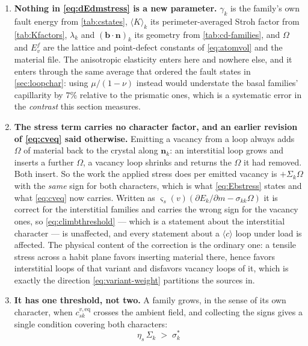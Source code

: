 \documentclass{article}
\newcommand{\cloop}{\ensuremath{\langle c\rangle}}
\newcommand{\bvec}{\bm b}
\newcommand{\nvec}{\bm n}
\begin{document}
\begin{enumerate}
\item \textbf{Nothing in \cref{eq:dEdmstress} is a new parameter.} $\gamma_k$ is
      the family's own fault energy from \cref{tab:cstates}, $\langle K\rangle_k$
      its perimeter-averaged Stroh factor from \cref{tab:Kfactors}, $\lambda_k$
      and $(\bvec\!\cdot\!\nvec)_k$ its geometry from \cref{tab:cd-families}, and
      $\Omega$ and $E^f_v$ are the lattice and point-defect constants of
      \cref{eq:atomvol} and the material file. The anisotropic elasticity enters
      here and nowhere else, and it enters through the same average that ordered
      the fault states in \cref{sec:loopchar}: using $\mu/(1-\nu)$ instead would
      understate the basal families' capillarity by $7\%$ relative to the
      prismatic ones, which is a systematic error in the \emph{contrast} this
      section measures.
\item \textbf{The stress term carries no character factor, and an earlier
      revision of \cref{eq:cveq} said otherwise.} Emitting a vacancy from a loop
      always adds $\Omega$ of material back to the crystal along $\nvec_k$: an
      interstitial loop grows and inserts a further $\Omega$, a vacancy loop
      shrinks and returns the $\Omega$ it had removed. Both insert. So the work
      the applied stress does per emitted vacancy is $+\Sigma_k\Omega$ with the
      \emph{same} sign for both characters, which is what \cref{eq:Ebstress}
      states and what \cref{eq:cveq} now carries. Written as
      $\varsigma_s(v)\left(\partial E_k/\partial m-\sigma_{kk}\Omega\right)$ it
      is correct for the interstitial families and carries the wrong sign for the
      vacancy ones, so \cref{eq:climbthreshold} --- which is a statement about the
      interstitial character --- is unaffected, and every statement about a
      \cloop{} loop under load is affected. The physical content of the
      correction is the ordinary one: a tensile stress across a habit plane
      favors inserting material there, hence favors interstitial loops of that
      variant and disfavors vacancy loops of it, which is exactly the direction
      \cref{eq:variant-weight} partitions the sources in.
\item \textbf{It has one threshold, not two.} A family grows, in the sense of its
      own character, when $c^{v,\mathrm{eq}}_{sk}$ crosses the ambient field, and
      collecting the signs gives a single condition covering both characters:
      \begin{equation}
        \eta_s\,\Sigma_k\;>\;\sigma^{\ast}_k

\end{equation}
\end{enumerate}
\end{document}
